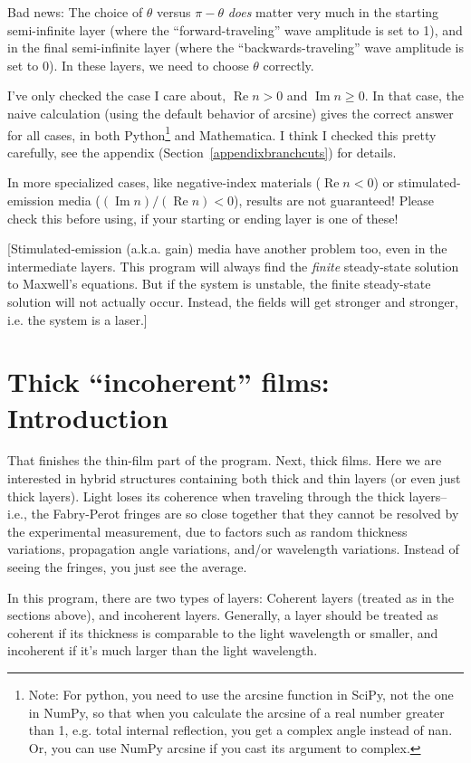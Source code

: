 \documentclass[12pt]{article}
\renewcommand{\(}{\left(}
\renewcommand{\)}{\right)}
\renewcommand{\Im}{\operatorname{Im}}
\renewcommand{\Re}{\operatorname{Re}}
\begin{document}
Bad news: The choice of $\theta$ versus $\pi-\theta$ \emph{does} matter very much in the starting semi-infinite layer (where the ``forward-traveling'' wave amplitude is set to 1), and in the final semi-infinite layer (where the ``backwards-traveling'' wave amplitude is set to 0). In these layers, we need to choose $\theta$ correctly.

I've only checked the case I care about, $\Re n>0$ and $\Im n \geq 0$. In that case, the naive calculation (using the default behavior of arcsine) gives the correct answer for all cases, in both Python\footnote{Note: For python, you need to use the arcsine function in SciPy, not the one in NumPy, so that when you calculate the arcsine of a real number greater than 1, e.g. total internal reflection, you get a complex angle instead of nan. Or, you can use NumPy arcsine if you cast its argument to complex.} and Mathematica. I think I checked this pretty carefully, see the appendix (Section~\ref{appendixbranchcuts}) for details.

In more specialized cases, like negative-index materials ($\Re n <0$) or stimulated-emission media ($(\Im n)/(\Re n)<0$), results are not guaranteed! Please check this before using, if your starting or ending layer is one of these!

[Stimulated-emission (a.k.a. gain) media have another problem too, even in the intermediate layers. This program will always find the \emph{finite} steady-state solution to Maxwell's equations. But if the system is unstable, the finite steady-state solution will not actually occur. Instead, the fields will get stronger and stronger, i.e. the system is a laser.]

\section{Thick ``incoherent'' films: Introduction}
That finishes the thin-film part of the program. Next, thick films. Here we are interested in hybrid structures containing both thick and thin layers (or even just thick layers). Light loses its coherence when traveling through the thick layers--i.e., the Fabry-Perot fringes are so close together that they cannot be resolved by the experimental measurement, due to factors such as random thickness variations, propagation angle variations, and/or wavelength variations. Instead of seeing the fringes, you just see the average.

In this program, there are two types of layers: Coherent layers (treated as in the sections above), and incoherent layers. Generally, a layer should be treated as coherent if its thickness is comparable to the light wavelength or smaller, and incoherent if it's much larger than the light wavelength.
\end{document}
